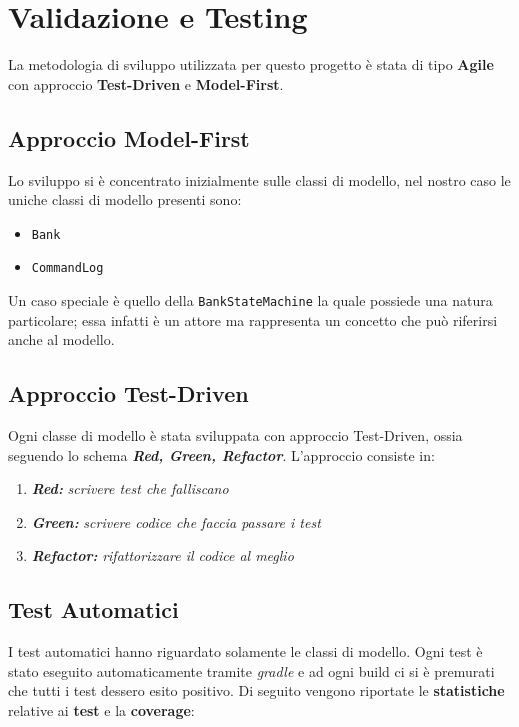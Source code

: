 \section{Validazione e Testing}
\label{Testing}
La metodologia di sviluppo utilizzata per questo progetto è stata di tipo \textbf{Agile} con approccio \textbf{Test-Driven} e \textbf{Model-First}.
  
  \subsection{Approccio Model-First}
  Lo sviluppo si è concentrato inizialmente sulle classi di modello, nel nostro caso le uniche classi di modello presenti sono: 
  \begin{itemize}
    \item \texttt{Bank}
    \item \texttt{CommandLog}
  \end{itemize}
  Un caso speciale è quello della \texttt{BankStateMachine} la quale possiede una natura particolare; essa infatti è un attore ma rappresenta un concetto che può riferirsi anche al modello.
  
  \subsection{Approccio Test-Driven}
  Ogni classe di modello è stata sviluppata con approccio Test-Driven, ossia seguendo lo schema \textbf{\textit{Red, Green, Refactor}}. L'approccio consiste in:
  \begin{enumerate}
    \item{\emph{\textbf{Red:}}}
    \emph{scrivere test che falliscano}
    \item{\emph{\textbf{Green:}}}
    \emph{scrivere codice che faccia passare i test}
    \item{\emph{\textbf{Refactor:}}}
    \emph{rifattorizzare il codice al meglio}
  \end{enumerate}

  \subsection{Test Automatici}
  I test automatici hanno riguardato solamente le classi di modello. Ogni test è stato eseguito automaticamente tramite \textit{gradle} e ad ogni build ci si è premurati che tutti i test dessero esito positivo. Di seguito vengono riportate le \textbf{statistiche} relative ai \textbf{test} e la \textbf{coverage}:

